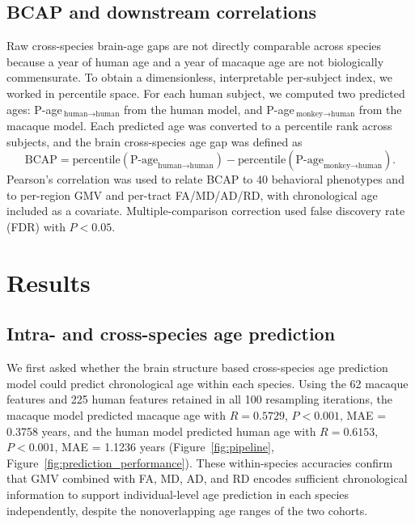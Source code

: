 \documentclass[11pt]{article}
\begin{document}
\subsection{BCAP and downstream correlations}

Raw cross-species brain-age gaps are not directly comparable across species because a year of human age and a year of macaque age are not biologically commensurate. To obtain a dimensionless, interpretable per-subject index, we worked in percentile space. For each human subject, we computed two predicted ages: P-age\,$_{\text{human}\to\text{human}}$ from the human model, and P-age\,$_{\text{monkey}\to\text{human}}$ from the macaque model. Each predicted age was converted to a percentile rank across subjects, and the brain cross-species age gap was defined as
\begin{equation}
\text{BCAP} = \text{percentile}(\text{P-age}_{\text{human}\to\text{human}}) - \text{percentile}(\text{P-age}_{\text{monkey}\to\text{human}}).
\end{equation}
Pearson's correlation was used to relate BCAP to 40 behavioral phenotypes and to per-region GMV and per-tract FA/MD/AD/RD, with chronological age included as a covariate. Multiple-comparison correction used false discovery rate (FDR) with $P < 0.05$.

\section{Results}

\subsection{Intra- and cross-species age prediction}

We first asked whether the brain structure based cross-species age prediction model could predict chronological age within each species. Using the 62 macaque features and 225 human features retained in all 100 resampling iterations, the macaque model predicted macaque age with $R = 0.5729$, $P < 0.001$, MAE = 0.3758 years, and the human model predicted human age with $R = 0.6153$, $P < 0.001$, MAE = 1.1236 years (Figure~\ref{fig:pipeline}, Figure~\ref{fig:prediction_performance}). These within-species accuracies confirm that GMV combined with FA, MD, AD, and RD encodes sufficient chronological information to support individual-level age prediction in each species independently, despite the nonoverlapping age ranges of the two cohorts.
\end{document}
